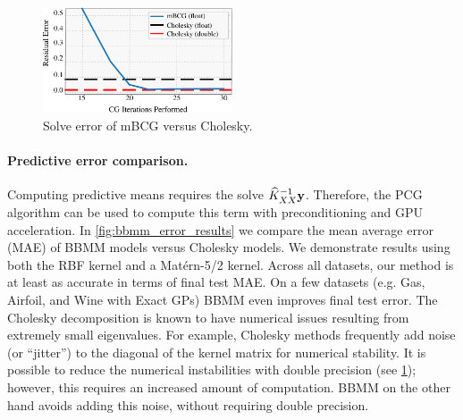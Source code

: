 \begin{figure}[t!]
  \begin{center}
    \includegraphics[width=0.50\textwidth]{figures/cg_error}
  \end{center}
  \caption{Solve error of mBCG versus Cholesky. \label{fig:cg_error}}
\end{figure}

\paragraph{Predictive error comparison.}
Computing predictive means requires the solve $\widehat{K}_{XX}^{-1} \mathbf{y}$.
Therefore, the PCG algorithm can be used to compute this term with preconditioning and GPU acceleration.
In \cref{fig:bbmm_error_results} we compare the mean average error (MAE) of BBMM models versus Cholesky models.
We demonstrate results using both the RBF kernel and a Mat\'ern-5/2 kernel.
Across all datasets, our method is at least as accurate in terms of final test MAE.
On a few datasets (e.g. Gas, Airfoil, and Wine with Exact GPs) BBMM even improves final test error.
The Cholesky decomposition is known to have numerical issues resulting from extremely small eigenvalues.
For example, Cholesky methods frequently add noise (or ``jitter'') to the diagonal of the kernel matrix for numerical stability.
It is possible to reduce the numerical instabilities with double precision (see \cref{fig:cg_error}); however, this requires an increased amount of computation.
BBMM on the other hand avoids adding this noise, without requiring double precision.

